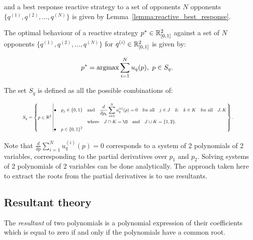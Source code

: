 and a best response reactive strategy to a set of opponents \(N\) opponents
\(\{q^{(1)}, q^{(2)}, \dots, q^{(N)} \}\) is given by
Lemma~\ref{lemma:reactive_best_response}.

\begin{lemma}\label{lemma:reactive_best_response}
    The optimal behaviour of a reactive strategy
    \(p^* \in \mathbb{R}_{[0, 1]} ^ 2\)
    against a set of \(N\) opponents \(\{q^{(1)}, q^{(2)}, \dots, q^{(N)} \}\)
    for \(q^{(i)} \in \mathbb{R}_{[0, 1]} ^ 2\) is given by:

    \[p^* = \textnormal{argmax}\sum\limits_{i=1} ^ N  u_q(p), \ p \in S_q.\]

    The set \(S_q\) is defined as all the possible combinations of:
    
    \begin{equation}\label{eq:s_q_reactive_set}
        \resizebox{.9\linewidth}{!}{ $
        S_q =
        \left\{p \in \mathbb{R} ^ 2 \left|
            \begin{aligned}
                \bullet\quad p_j \in \{0, 1\} & \quad \text{and} \quad \frac{d}{dp_k} 
                \sum\limits_{i=1} ^ N  u_q^{(i)}(p) = 0
                \quad \text{for all} \quad j \in J \quad \&  \quad k \in K  \quad \text{for all} \quad J, K \\
                & \quad \text{where} \quad J \cap K = \O \quad
                \text{and} \quad J \cup K = \{1, 2\}.\\
                \bullet\quad  p \in \{0, 1\} ^ 2
            \end{aligned}\right.
        \right\}.
        $}
    \end{equation}
\end{lemma}

Note that \(\frac{d}{dp} \sum\limits_{i=1} ^ N  u_q^{(i)}(p) = 0\) corresponds
to a system of 2 polynomials of 2 variables, corresponding to the partial
derivatives over \(p_1\) and \(p_2\). Solving systems of 2 polynomials of 2
variables can be done analytically. The approach taken here to extract the roots
from the partial derivatives is to use resultants.

\subsection{Resultant theory}

The \textit{resultant} of two polynomials is a polynomial expression of
their coefficients which is equal to zero if and only if the polynomials have a
common root. 

